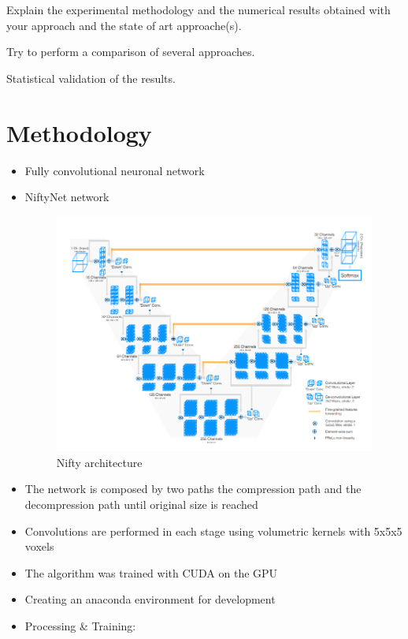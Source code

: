 \documentclass[runningheads,a4paper,11pt]{report}
\begin{document}
Explain the experimental methodology and the numerical results obtained with your approach and the state of art approache(s).

Try to perform a comparison of several approaches.

Statistical validation of the results.

\renewcommand{\labelitemii}{$\circ$}
\renewcommand{\labelitemiii}{\scalebox{0.5}{$\blacksquare$}}
\section{Methodology}
\label{section:methodology}

\begin{itemize}
    \item Fully convolutional neuronal network
    \item NiftyNet network
     \begin{figure}[htbp]
	    \centerline{\includegraphics{Images/NiftyArch.png}}  
	    \caption{Nifty architecture}
	\label{NiftyArch}
    \end{figure}
    \item The network is composed by two paths the compression path and the decompression path until original size is reached
    \item Convolutions are performed in each stage using volumetric kernels with 5x5x5 voxels
    \item The algorithm was trained with CUDA on the GPU
    \item Creating an anaconda environment for development
    \item Processing \& Training:

\end{itemize}
\end{document}
